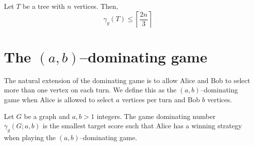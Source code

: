 \begin{theorem}
    Let $T$ be a tree with $n$ vertices. Then,    
    \[ \gamma_g(T) \leq \left\lceil \frac{2n}{3} \right\rceil\]
\end{theorem}
 
%
%    
%        
%    
%   
%       

\section{The $(a,b)$--dominating game}

The natural extension of the dominating game is to allow Alice and Bob to select more than one vertex on each turn. We define this as the $(a,b)$--dominating game when Alice is allowed to select $a$ vertices per turn and Bob $b$ vertices.

\begin{definition}
    Let $G$ be a graph and $a,b>1$ integers. The game dominating number $\gamma_g(G;a,b)$ is the smallest target score such that Alice has a winning strategy when playing the $(a,b)$--dominating game.
\end{definition}

